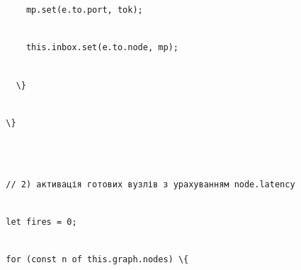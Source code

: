 \documentclass[
]{article}
\newcommand{\passthrough}[1]{#1}
\begin{document}
\passthrough{\lstinline!      !}\passthrough{\lstinline!mp!}\passthrough{\lstinline!.!}\passthrough{\lstinline!set!}\passthrough{\lstinline!(!}\passthrough{\lstinline!e!}\passthrough{\lstinline!.!}\passthrough{\lstinline!to!}\passthrough{\lstinline!.!}\passthrough{\lstinline!port!}\passthrough{\lstinline!,!}\passthrough{\lstinline! !}\passthrough{\lstinline!tok!}\passthrough{\lstinline!);!}\strut \\
\passthrough{\lstinline!      !}\passthrough{\lstinline!this!}\passthrough{\lstinline!.!}\passthrough{\lstinline!inbox!}\passthrough{\lstinline!.!}\passthrough{\lstinline!set!}\passthrough{\lstinline!(!}\passthrough{\lstinline!e!}\passthrough{\lstinline!.!}\passthrough{\lstinline!to!}\passthrough{\lstinline!.!}\passthrough{\lstinline!node!}\passthrough{\lstinline!,!}\passthrough{\lstinline! !}\passthrough{\lstinline!mp!}\passthrough{\lstinline!);!}\strut \\
\passthrough{\lstinline!    !}\passthrough{\lstinline!\}!}\strut \\
\passthrough{\lstinline!  !}\passthrough{\lstinline!\}!}\strut \\
\strut \\
\passthrough{\lstinline!  !}\passthrough{\lstinline!//!}\passthrough{\lstinline! !}\passthrough{\lstinline!2)!}\passthrough{\lstinline! !}\passthrough{\lstinline!активація!}\passthrough{\lstinline! !}\passthrough{\lstinline!готових!}\passthrough{\lstinline! !}\passthrough{\lstinline!вузлів!}\passthrough{\lstinline! !}\passthrough{\lstinline!з!}\passthrough{\lstinline! !}\passthrough{\lstinline!урахуванням!}\passthrough{\lstinline! !}\passthrough{\lstinline!node!}\passthrough{\lstinline!.!}\passthrough{\lstinline!latency!}\strut \\
\passthrough{\lstinline!  !}\passthrough{\lstinline!let!}\passthrough{\lstinline! !}\passthrough{\lstinline!fires!}\passthrough{\lstinline! !}\passthrough{\lstinline!=!}\passthrough{\lstinline! !}\passthrough{\lstinline!0;!}\strut \\
\passthrough{\lstinline!  !}\passthrough{\lstinline!for!}\passthrough{\lstinline! !}\passthrough{\lstinline!(!}\passthrough{\lstinline!const!}\passthrough{\lstinline! !}\passthrough{\lstinline!n!}\passthrough{\lstinline! !}\passthrough{\lstinline!of!}\passthrough{\lstinline! !}\passthrough{\lstinline!this!}\passthrough{\lstinline!.!}\passthrough{\lstinline!graph!}\passthrough{\lstinline!.!}\passthrough{\lstinline!nodes!}\passthrough{\lstinline!)!}\passthrough{\lstinline! !}\passthrough{\lstinline!\{!}\strut \\
\end{document}
